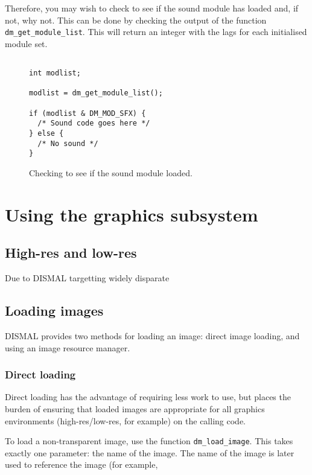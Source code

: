 \documentclass[a4paper]{scrbook}
\begin{document}
Therefore, you may wish to check to see if the sound module has loaded
and, if not, why not. This can be done by checking the output of the
function \verb:dm_get_module_list:. This will return an integer with
the lags for each initialised module set.

\begin{figure}[h]
  \begin{verbatim}

int modlist;

modlist = dm_get_module_list(); 

if (modlist & DM_MOD_SFX) {
  /* Sound code goes here */
} else {
  /* No sound */
}
  \end{verbatim}

\caption{Checking to see if the sound module loaded.}

\end{figure}

\chapter{Using the graphics subsystem}

\section{High-res and low-res}

Due to DISMAL targetting widely disparate 

\section{Loading images}

DISMAL provides two methods for loading an image: direct image
loading, and using an image resource manager.

\subsection{Direct loading}

Direct loading has the advantage of requiring less work to use, but
places the burden of ensuring that loaded images are appropriate for
all graphics environments (high-res/low-res, for example) on the
calling code.

To load a non-transparent image, use the function
\verb:dm_load_image:. This takes exactly one parameter: the name of
the image. The name of the image is later used to reference the image
(for example, 
\end{document}
